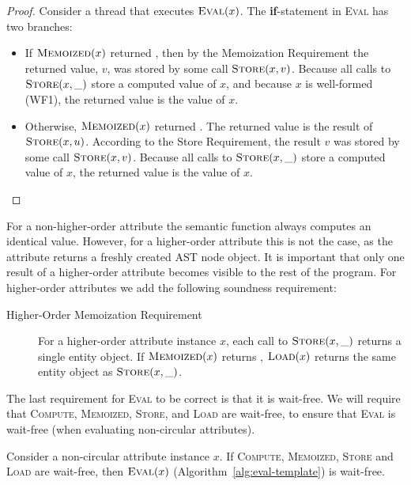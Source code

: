 {\begin{proof}
  Consider a thread that executes $\textsc{Eval}(x)$.
  The \textbf{if}-statement in \textsc{Eval} has two branches:

  \begin{itemize}
    \item
      If $\textsc{Memoized}(x)$ returned \true{},
      then by the Memoization Requirement the returned value, $v$,
      was stored by some call $\textsc{Store}(x, v)$.
      Because all calls to $\textsc{Store}(x, \_)$ store a computed value of $x$,
      and because $x$ is well-formed (WF1),
      the returned value is the value of $x$.
    \item
      Otherwise, $\textsc{Memoized}(x)$ returned \false{}.
      The returned value is the result of $\textsc{Store}(x, u)$.
      According to the Store Requirement, the result $v$
      was stored by some call $\textsc{Store}(x, v)$.
      Because all calls to $\textsc{Store}(x, \_)$ store a computed value of $x$,
      the returned value is the value of $x$.
  \end{itemize}
\end{proof}

For a non-higher-order attribute the semantic function always computes an identical value.
However, for a higher-order
attribute this is not the case, as the attribute returns a
freshly created AST node object.
It is important that only one result of a higher-order attribute becomes visible to
the rest of the program.
For higher-order attributes we add the following soundness requirement:

\begin{description}
  \item[Higher-Order Memoization Requirement]
    For a higher-order attribute instance $x$,
    each call to $\textsc{Store}(x, \_)$ returns a single entity object.
    If $\textsc{Memoized}(x)$ returns \true{},
    $\textsc{Load}(x)$ returns the same entity object as $\textsc{Store}(x, \_)$.
\end{description}

The last requirement for \textsc{Eval} to be correct is that it is wait-free.
We will require that \textsc{Compute}, \textsc{Memoized}, \textsc{Store}, and \textsc{Load}
are wait-free, to ensure that \textsc{Eval} is wait-free (when evaluating non-circular attributes).

\begin{theorem}
  Consider a non-circular attribute instance $x$.
  If \textsc{Compute}, \textsc{Memoized}, \textsc{Store} and \textsc{Load} are wait-free,
  then $\textsc{Eval}(x)$ (Algorithm~\ref{alg:eval-template}) is wait-free.


\end{theorem}}
